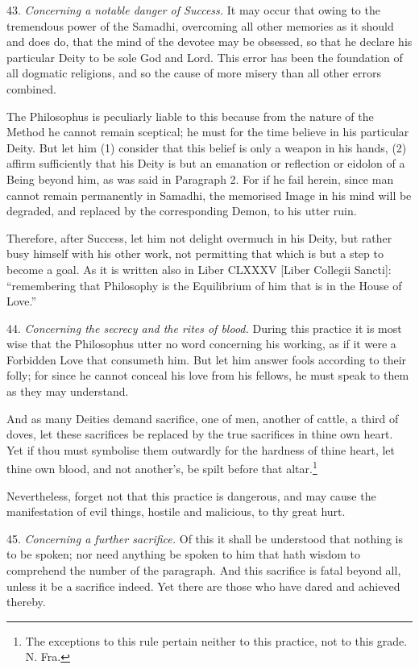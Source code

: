 43. \textit{Concerning a notable danger of Success.} It may occur that owing to the tremendous power of the Samadhi, overcoming all other memories as it should and does do, that the mind of the devotee may be obsessed, so that he declare his particular Deity to be sole God and Lord. This error has been the foundation of all dogmatic religions, and so the cause of more misery than all other errors combined.

The Philosophus is peculiarly liable to this because from the nature of the Method he cannot remain sceptical; he must for the time believe in his particular Deity. But let him (1) consider that this belief is only a weapon in his hands, (2) affirm sufficiently that his Deity is but an emanation or reflection or eidolon of a Being beyond him, as was said in Paragraph 2. For if he fail herein, since man cannot remain permanently in Samadhi, the memorised Image in his mind will be degraded, and replaced by the corresponding Demon, to his utter ruin.

Therefore, after Success, let him not delight overmuch in his Deity, but rather busy himself with his other work, not permitting that which is but a step to become a goal. As it is written also in Liber CLXXXV [Liber Collegii Sancti]: \enquote{remembering that Philosophy is the Equilibrium of him that is in the House of Love.}

44. \textit{Concerning the secrecy and the rites of blood.} During this practice it is most wise that the Philosophus utter no word concerning his working, as if it were a Forbidden Love that consumeth him. But let him answer fools according to their folly; for since he cannot conceal his love from his fellows, he must speak to them as they may understand.

And as many Deities demand sacrifice, one of men, another of cattle, a third of doves, let these sacrifices be replaced by the true sacrifices in thine own heart. Yet if thou must symbolise them outwardly for the hardness of thine heart, let thine own blood, and not another's, be spilt before that altar.\footnote{The exceptions to this rule pertain neither to this practice, not to this grade. N. Fra. \Argentium{}}

Nevertheless, forget not that this practice is dangerous, and may cause the manifestation of evil things, hostile and malicious, to thy great hurt.

45. \textit{Concerning a further sacrifice.} Of this it shall be understood that nothing is to be spoken; nor need anything be spoken to him that hath wisdom to comprehend the number of the paragraph. And this sacrifice is fatal beyond all, unless it be a sacrifice indeed. Yet there are those who have dared and achieved thereby.

